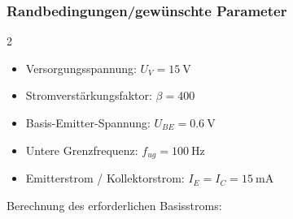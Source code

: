 \subsubsection*{Randbedingungen/gewünschte Parameter}
\begin{multicols}{2}
\begin{itemize}
  \item Versorgungsspannung: \(U_V = \qty{15}{\volt}\)
  \item Stromverstärkungsfaktor: \(\beta = 400\)
  \item Basis-Emitter-Spannung: \(U_{BE} = \qty{0.6}{\volt}\)
  \item Untere Grenzfrequenz: \(f_{ug} = \qty{100}{\hertz}\)
  \item Emitterstrom / Kollektorstrom: \(I_E = I_C = \qty{15}{\milli\ampere}\)  
\end{itemize}
\end{multicols}
Berechnung des erforderlichen Basisstroms:
